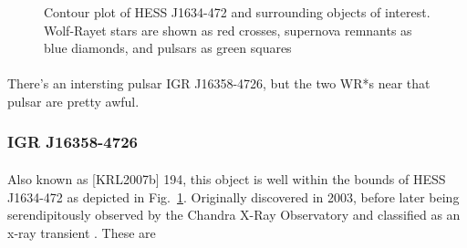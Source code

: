 \documentclass[a4paper, titlepage, oneside]{article}
\begin{document}
\begin{multicols}{2}
\begin{figure}[H]
  \centering
  \caption{Contour plot of HESS J1634-472 and surrounding objects of interest. Wolf-Rayet stars are shown as red crosses, supernova remnants as blue diamonds, and pulsars as green squares}
  \label{fig:hess34}
\end{figure}

\paragraph{}
There's an intersting pulsar IGR J16358-4726, but the two WR*s near that pulsar are pretty awful.

\subsubsection{IGR J16358-4726}
\paragraph{}
Also known as [KRL2007b] 194, this object is well within the bounds of HESS J1634-472 as depicted in Fig.~\ref{fig:hess34}. Originally discovered in 2003, before later being serendipitously observed by the Chandra X-Ray Observatory and classified as an x-ray transient \parencite{Patel:2004}. These are


\end{multicols}
\end{document}
